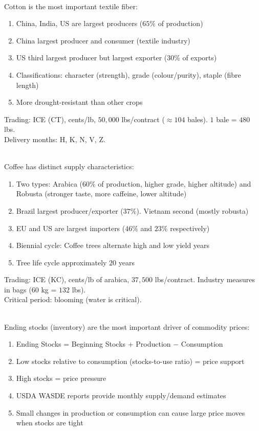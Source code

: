 \begin{remark} \\
Cotton is the most important textile fiber:
\begin{enumerate}[label=\roman*.]
\setlength{\itemsep}{0pt}
\item China, India, US are largest producers ($65\%$ of production)
\item China largest producer and consumer (textile industry)
\item US third largest producer but largest exporter ($30\%$ of exports)
\item Classifications: character (strength), grade (colour/purity), staple (fibre length)
\item More drought-resistant than other crops
\end{enumerate}
Trading: ICE (CT), cents/lb, $50,00$0 lbs/contract ($\approx 104$ bales). $1$ bale = $480$ lbs.\\
Delivery months: H, K, N, V, Z.
\end{remark}

\begin{remark} \\
Coffee has distinct supply characteristics:
\begin{enumerate}[label=\roman*.]
\setlength{\itemsep}{0pt}
\item Two types: Arabica ($60\%$ of production, higher grade, higher altitude) and Robusta (stronger taste, more caffeine, lower altitude)
\item Brazil largest producer/exporter ($37\%$). Vietnam second (mostly robusta)
\item EU and US are largest importers ($46\%$ and $23\%$ respectively)
\item Biennial cycle: Coffee trees alternate high and low yield years
\item Tree life cycle approximately $20$ years
\end{enumerate}
Trading: ICE (KC), cents/lb of arabica, $37,500$ lbs/contract. Industry measures in bags ($60$ kg = $132$ lbs).\\
Critical period: blooming (water is critical).
\end{remark}

\begin{remark} \\
Ending stocks (inventory) are the most important driver of commodity prices:
\begin{enumerate}[label=\roman*.]
\setlength{\itemsep}{0pt}
\item Ending Stocks = Beginning Stocks + Production $-$ Consumption
\item Low stocks relative to consumption (stocks-to-use ratio) = price support
\item High stocks = price pressure
\item USDA WASDE reports provide monthly supply/demand estimates
\item Small changes in production or consumption can cause large price moves when stocks are tight
\end{enumerate}
\end{remark}

